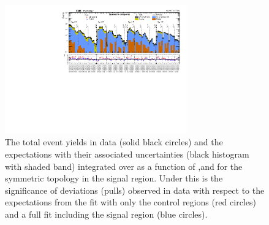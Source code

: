 \begin{figure}[!htb]
  \begin{center}
    \includegraphics[angle=90,width=0.7\textwidth]{figs/analysis/results/summaryPlot_Symmetric_prefit_overlay_fit_b}
    \caption{The total event yields in data (solid black circles)
      and the \SM expectations with their associated uncertainties (black
      histogram with shaded band) integrated over \MHT as a function of
      \nj,\nb and \HT for the symmetric topology in the
      signal region. Under this is the significance of deviations
      (pulls) observed in data with respect to the \SM expectations
      from the fit with only the control regions (red circles) and a
      full fit including the signal region (blue circles).}
    \label{fig:sym}
  \end{center}
\end{figure}

